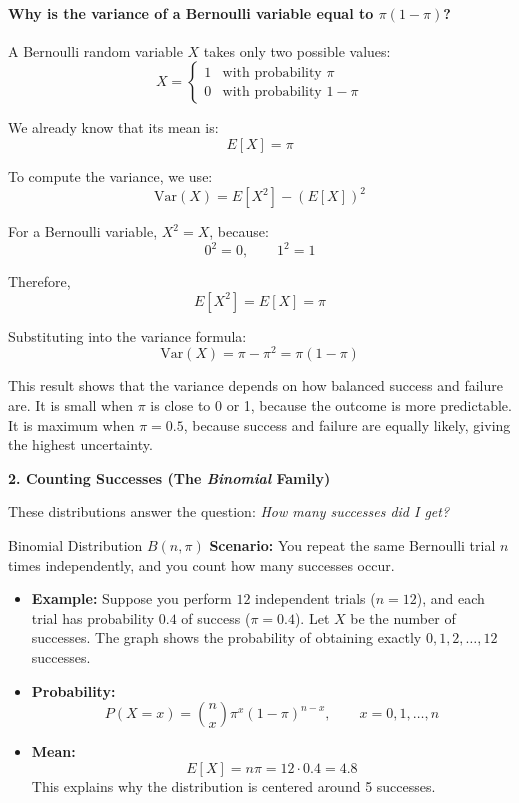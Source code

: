 \documentclass[11pt]{article}
\theoremstyle{smallexample}
\newcommand{\vs}{\vspace{0.2\baselineskip}}
\begin{document}
\paragraph*{Why is the variance of a Bernoulli variable equal to \(\pi(1-\pi)\)?}
A Bernoulli random variable \(X\) takes only two possible values:
\[
X =
\begin{cases}
1 & \text{with probability } \pi \\
0 & \text{with probability } 1-\pi
\end{cases}
\]

We already know that its mean is:
\[
E[X]=\pi
\]

To compute the variance, we use:
\[
\mathrm{Var}(X)=E[X^2]-(E[X])^2
\]

For a Bernoulli variable, \(X^2=X\), because:
\[
0^2=0, \qquad 1^2=1
\]

Therefore,
\[
E[X^2]=E[X]=\pi
\]

Substituting into the variance formula:
\[
\mathrm{Var}(X)=\pi-\pi^2=\pi(1-\pi)
\]

This result shows that the variance depends on how balanced success and failure are. It is small when \(\pi\) is close to 0 or 1, because the outcome is more predictable. It is maximum when \(\pi=0.5\), because success and failure are equally likely, giving the highest uncertainty.


\vspace{0.25cm}
\textbf{2. Counting Successes (The \textit{Binomial} Family)}

These distributions answer the question: \textit{How many successes did I get?}

\vs

\begin{defbox}{Binomial Distribution $B(n, \pi)$}
\textbf{Scenario:} You repeat the same Bernoulli trial \(n\) times independently, and you count how many successes occur.

\begin{itemize}
    \item \textbf{Example:} Suppose you perform \(12\) independent trials (\(n=12\)), and each trial has probability \(0.4\) of success (\(\pi=0.4\)). Let \(X\) be the number of successes. The graph shows the probability of obtaining exactly \(0,1,2,\dots,12\) successes.

\vs

    \item \textbf{Probability:}
    \begin{equation}
    P(X=x)=\binom{n}{x}\pi^x(1-\pi)^{n-x}, \qquad x=0,1,\dots,n
    \end{equation}
    \item \textbf{Mean:}
    \begin{equation}
    E[X]=n\pi=12 \cdot 0.4=4.8
   \end{equation}
    This explains why the distribution is centered around 5 successes.
\end{itemize}
\end{defbox}
\end{document}
